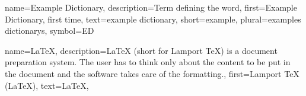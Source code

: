 {
    name={Example Dictionary},
    description={Term defining the word},
    first={Example Dictionary, first time},
    text={example dictionary},
    short={example},
    plural={examples dictionarys},
    symbol={ED}
}

{
    name={\LaTeX},
    description={LaTeX (short for Lamport TeX) is a document preparation system. The user has to
            think only about the content to be put in the document and the software takes care of
            the formatting.},
    first={Lamport TeX (\LaTeX)},
    text={\LaTeX},
}
